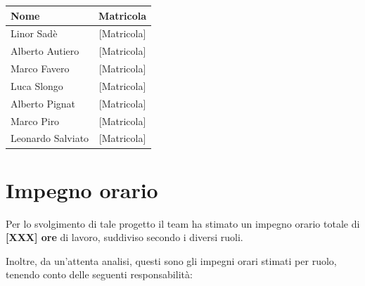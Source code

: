 \documentclass[a4paper,12pt]{article}
\begin{document}
\begin{center}
\begin{tcolorbox}[colback=lightgray,colframe=primaryblue,width=0.85\textwidth,arc=3mm,boxrule=0.5pt,title={\bfseries Il team BugBusters}]
\begin{center}
\begin{tabular}{lc}
\toprule
\textbf{Nome} & \textbf{Matricola} \\
\midrule
Linor Sadè & {[Matricola]} \\
Alberto Autiero & {[Matricola]} \\
Marco Favero & {[Matricola]} \\
Luca Slongo & {[Matricola]} \\
Alberto Pignat & {[Matricola]} \\
Marco Piro & {[Matricola]} \\
Leonardo Salviato & {[Matricola]} \\
\bottomrule
\end{tabular}
\end{center}
\end{tcolorbox}
\end{center}

\vspace{1cm}

\renewcommand{\cftsecpagefont}{\normalfont}
\renewcommand{\cftsecleader}{\cftdotfill{\cftsecdotsep}}
\setlength{\cftbeforesecskip}{2pt}
\begin{center}
\begin{tcolorbox}[colback=lightgray,colframe=darkgray,width=0.9\textwidth,arc=2mm,boxrule=0.5pt]
\tableofcontents
\end{tcolorbox}
\end{center}

\newpage

\section{Impegno orario}

Per lo svolgimento di tale progetto il team ha stimato un impegno orario totale di \textbf{[XXX] ore} di lavoro, suddiviso secondo i diversi ruoli.

Inoltre, da un'attenta analisi, questi sono gli impegni orari stimati per ruolo, tenendo conto delle seguenti responsabilità:

\vspace{0.5cm}
\end{document}
